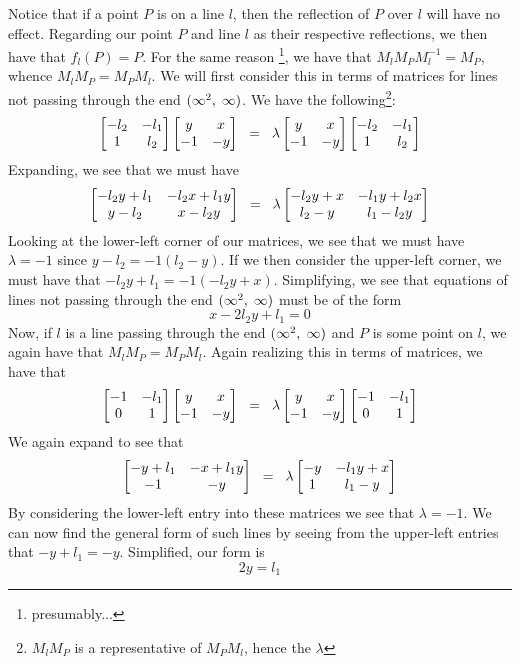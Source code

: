 \documentclass[12pt]{article}
\newcommand{\inv}{^{-1}}
\newcommand{\spceq}{\hspace{2mm} = \hspace{2mm}}
\newcommand{\ttc}{, \hspace{1mm}}
\newcommand{\lftmat}[4]{\begin{bmatrix} {#1} & {#2} \\ {#3} & {#4} \end{bmatrix}}
\newcommand{\pointmat}[2]{\lftmat{{#2}}{{#1}}{-1}{-{#2}}}
\newcommand{\stanpointmat}{\pointmat{x}{y}}
\newcommand{\linenoendmat}[2]{\begin{bmatrix} -{#2} & -{#1} \\ 1 & {#2} \end{bmatrix}}
\newcommand{\stanlinenoendmat}{\linenoendmat{l_1}{l_2}}
\newcommand{\lineendmat}[2]{\begin{bmatrix} -1 & -{#1} \\ 0 & 1 \end{bmatrix}}
\newcommand{\stanlineendmat}{\lineendmat{l_1}{l_2}}
\newcommand{\specialend}{(\infty^2\ttc\infty)}
\theoremstyle{plain}
\theoremstyle{definition}
\begin{document}
Notice that if a point $P$ is on a line $l$, then the reflection of $P$ over $l$ will have no effect. Regarding our point $P$ and line $l$ as their respective reflections, we then have that $f_l(P) = P$. For the same reason \footnote{presumably...}, we have that $M_l M_P M_l\inv = M_P$, whence $M_l M_P = M_P M_l$. We will first consider this in terms of matrices for lines not passing through the end $\specialend$. We have the following\footnote{$M_l M_P$ is a representative of $M_P M_l$, hence the $\lambda$}:
\begin{equation} 
\stanlinenoendmat\stanpointmat \spceq \lambda \stanpointmat\stanlinenoendmat
\end{equation}	
Expanding, we see that we must have
	\[
		\lftmat{-l_2y+l_1}{-l_2x+l_1y}{y-l_2}{x-l_2y} \spceq \lambda \lftmat{-l_2y+x}{-l_1y+l_2x}{l_2-y}{l_1-l_2y}
	\]
Looking at the lower-left corner of our matrices, we see that we must have $\lambda = -1$ since $y - l_2 = -1(l_2 - y)$. If we then consider the upper-left corner, we must have that $-l_2y + l_1 = -1(-l_2y + x)$. Simplifying, we see that equations of lines not passing through the end $\specialend$ must be of the form
\begin{equation}
	x - 2l_2y + l_1  = 0
\end{equation} 
Now, if $l$ is a line passing through the end $\specialend$ and $P$ is some point on $l$, we again have that $M_l M_P = M_P M_l$. Again realizing this in terms of matrices, we have that 
\begin{equation} 
	\stanlineendmat\stanpointmat \spceq \lambda \stanpointmat\stanlineendmat
\end{equation}	
We again expand to see that 
	\[
		\lftmat{-y+l_1}{-x+l_1y}{-1}{-y} \spceq \lambda \lftmat{-y}{-l_1y+x}{1}{l_1-y}
	\]
By considering the lower-left entry into these matrices we see that $\lambda = -1$. We can now find the general form of such lines by seeing from the upper-left entries that $-y+l_1 = -y$. Simplified, our form is 
\begin{equation}
	2y = l_1
\end{equation} 

\end{document}
